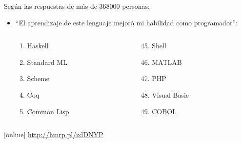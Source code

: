 \documentclass[spanish]{beamer}
\begin{document}
\begin{frame}
  Según las respuestas de más de 368000 personas:
  \begin{itemize}
  \item
    ``El aprendizaje de este lenguaje mejoró mi habilidad como
    programador'':
    \begin{columns}[T]
      \begin{column}{3cm}
        \begin{enumerate}
        \item Haskell
        \item Standard ML
        \item Scheme
        \item Coq
        \item Common Lisp
        \end{enumerate}
      \end{column}
      \begin{column}{3cm}
        \begin{enumerate}
        \setcounter{enumi}{44}
        \item Shell
        \item MATLAB
        \item PHP
        \item Visual Basic
        \item COBOL
        \end{enumerate}
      \end{column}
    \end{columns}
  \end{itemize}
  \begin{thebibliography}{}
  [online]
    \newblock \url{http://hmrp.pl/zdDNYP}
  \end{thebibliography}
\end{frame}

\end{document}
